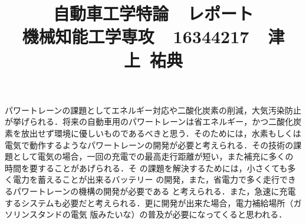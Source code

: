 \documentclass[a4paper,12pt]{jarticle}
\begin{document}
%
\title{\vspace{-30mm}  自動車工学特論~~レポート \\ 機械知能工学専攻~~16344217~~津上~祐典}
\date{}
%
\maketitle
%
\vspace{-20mm}
%
パワートレーンの課題としてエネルギー対応や二酸化炭素の削減，大気汚染防止
が挙げられる．将来の自動車用のパワートレーンは省エネルギー，かつ二酸化炭
素を放出せず環境に優しいものであるべきと思う．そのためには，水素もしくは
電気で動作するようなパワートレーンの開発が必要と考えられる．その技術の課
題として電気の場合，一回の充電での最高走行距離が短い，また補充に多くの
時間を要することがあげられる．そ
の課題を解決するためには，小さくても多く電力を蓄えることが出来るバッテリー
の開発，また，省電力で多く走行できるパワートレーンの機構の開発が必要である
と考えられる．また，急速に充電するシステムも必要だと考えられる．更に開発が出来た場合，電力補給場所（ガソリンスタンドの電気
版みたいな）の普及が必要になってくると思われる．
\end{document}
